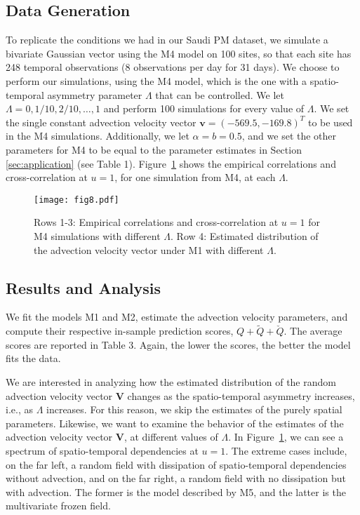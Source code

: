 \documentclass[12pt]{article}
\newcommand{\0}{\mathbf{0}}
\begin{document}
 
\subsection{Data Generation}

To replicate the conditions we had in our Saudi PM dataset, we simulate a bivariate Gaussian vector using the M4 model on 100 sites, so that each site has 248 temporal observations (8 observations per day for 31 days). We choose to perform our simulations, using the M4 model, which is the one with a spatio-temporal asymmetry parameter $\Lambda$ that can be controlled. We let $\Lambda=0,1/10,2/10,\ldots,1$ and perform 100 simulations for every value of $\Lambda$. We set the single constant advection velocity vector $\mathbf{v}=(-569.5, -169.8)^T$ to be used in the M4 simulations. Additionally, we let $\alpha=b=0.5$, and we set the other parameters for M4 to be equal to the parameter estimates in Section \ref{sec:application}  (see Table 1). Figure~\ref{fig:m4data} shows the empirical correlations and cross-correlation at $u=1$, for one simulation from M4, at each $\Lambda$. 
\begin{figure}[t!]
 \centering
\texttt{[image: fig8.pdf]}
  \caption{\small Rows 1-3: Empirical correlations and cross-correlation at $u=1$ for M4 simulations with different $\Lambda$. Row 4: Estimated distribution of the advection velocity vector under M1 with different $\Lambda$.}
    \label{fig:m4data}
\end{figure}



\subsection{Results and Analysis}

We fit the models M1 and M2, estimate the advection velocity parameters, and compute their respective in-sample prediction scores, $Q + \tilde{Q} + \check{Q} $. The average scores are reported in Table 3. Again, the lower the scores, the better the model fits the data. 

We are interested in analyzing how the estimated distribution of the random advection velocity vector $\mathbf{V}$ changes as the spatio-temporal asymmetry increases, i.e., as $\Lambda$ increases. For this reason, we skip the estimates of the purely spatial parameters. Likewise, we want to examine the behavior of the estimates of the advection velocity vector $\mathbf{V}$, at different values of $\Lambda$. In Figure~\ref{fig:m4data}, we can see a spectrum of spatio-temporal dependencies at $u=1$. The extreme cases include, on the far left, a random field with dissipation of spatio-temporal dependencies without advection, and on the far right, a random field with no dissipation but with advection. The former is the model described by M5, and the latter is the multivariate frozen field. 
\end{document}

